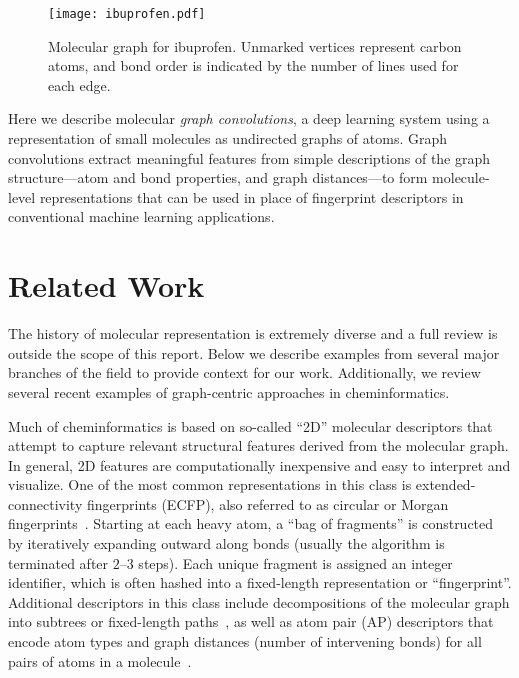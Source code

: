 \begin{figure}[tb]
\centering
  \texttt{[image: ibuprofen.pdf]}
  \caption{
    Molecular graph for ibuprofen. Unmarked vertices represent carbon atoms, and
    bond order is indicated by the number of lines used for each edge.
  }
  \label{fig:ibuprofen}
\end{figure}

Here we describe molecular \emph{graph convolutions}, a deep learning
system using a representation of small molecules as undirected graphs of atoms.
Graph convolutions extract meaningful features from simple
descriptions of the graph structure---atom and bond properties, and
graph distances---to form molecule-level representations that can be
used in place of fingerprint descriptors in conventional
machine learning applications.

\section{Related Work}\label{sec:related_work}

The history of molecular representation is extremely diverse
\citep{todeschini2009molecular} and a full review is outside the scope of this
report. Below we describe examples from several major branches of the field to
provide context for our work. Additionally, we review several recent examples of
graph-centric approaches in cheminformatics.

Much of cheminformatics is based on so-called ``2D'' molecular descriptors that
attempt to capture relevant structural features derived from the molecular
graph. In general, 2D features are computationally inexpensive and easy to
interpret and visualize. One of the most common representations in this class is
extended-connectivity fingerprints (ECFP), also referred to as circular or
Morgan fingerprints~\citep{rogers2010extended}. Starting at each heavy atom, a
``bag of fragments'' is constructed by iteratively expanding outward along bonds
(usually the algorithm is terminated after $2$--$3$ steps). Each unique fragment
is assigned an integer identifier, which is often hashed into a fixed-length
representation or ``fingerprint''. Additional descriptors in this class include
decompositions of the molecular graph into subtrees or fixed-length
paths~\citep{oegraphsimtk}, as well as atom pair (AP) descriptors that encode
atom types and graph distances (number of intervening bonds) for all pairs of
atoms in a molecule~\citep{carhart1985atom}.

